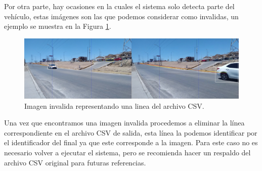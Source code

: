 Por otra parte, hay ocasiones en la cuales el sistema solo detecta parte del vehículo, estas imágenes son las que podemos considerar como invalidas, un ejemplo se muestra en la Figura \ref{fig:ImagenInvalida}.

\begin{figure}[H]
    \centering
    \includegraphics[width=1\textwidth]{Metodologia/imgs/Invalido.jpg}
    \caption{Imagen invalida representando una linea del archivo CSV.}
    \label{fig:ImagenInvalida}
\end{figure}

Una vez que encontramos una imagen invalida procedemos a eliminar la línea correspondiente en el archivo CSV de salida, esta línea la podemos identificar por el identificador del final ya que este corresponde a la imagen. Para este caso no es necesario volver a ejecutar el sistema, pero se recomienda hacer un respaldo del archivo CSV original para futuras referencias.

